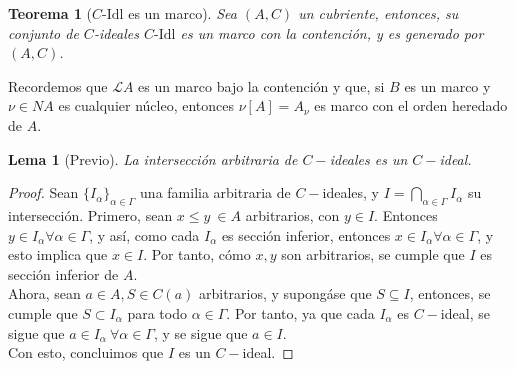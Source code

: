 \documentclass[12pt,letterpaper,titlepage]{article}
\newtheorem{lemma}{Lema}
\newtheorem{thm}{Teorema}
\theoremstyle{definition}
\newcommand\<{\langle}
\renewcommand\>{\rangle}
\newcommand\Idl{\text{-}\mathrm{Idl}}
\begin{document}
\begin{thm}[$C\Idl$ es un marco]
    Sea $(A,C)$ un cubriente, entonces, su conjunto de $C$-ideales $C\Idl$ es un marco con la contención, y es generado por $(A,C)$.
\end{thm}

Recordemos que $\mathcal{L}A$ es un marco bajo la contención
y que, si $B$ es un marco y $\nu\in NA$ es cualquier núcleo,
entonces $\nu[A]=A_\nu$ es marco con el orden heredado de $A$.

\begin{lemma}[Previo]
    La intersección arbitraria de $C-$ideales es un $C-$ideal.
\end{lemma}
\begin{proof}
    Sean $\{I_\alpha\}_{\alpha\in\Gamma}$ una familia arbitraria de $C-$ideales, y $I=\bigcap_{\alpha\in\Gamma}I_\alpha$ su intersección. Primero, sean $x\leq y\ \in A$ arbitrarios, con $y\in I$. Entonces $y\in I_\alpha\forall\alpha\in\Gamma$, y así, como cada $I_\alpha$ es sección inferior, entonces $x\in I_\alpha\forall\alpha\in\Gamma$, y esto implica que $x\in I$. Por tanto, cómo $x,y$ son arbitrarios, se cumple que $I$ es sección inferior de $A$.\\
    Ahora, sean $a\in A, S\in C(a)$ arbitrarios, y supongáse que $S\subseteq I$, entonces, se cumple que $S\subset I_\alpha$ para todo $\alpha\in\Gamma$. Por tanto, ya que cada $I_\alpha$ es $C-$ideal, se sigue que $a\in I_\alpha\ \forall\alpha\in\Gamma$, y se sigue que $a\in I$.\\
    Con esto, concluimos que $I$ es un $C-$ideal.
\end{proof}
\end{document}
